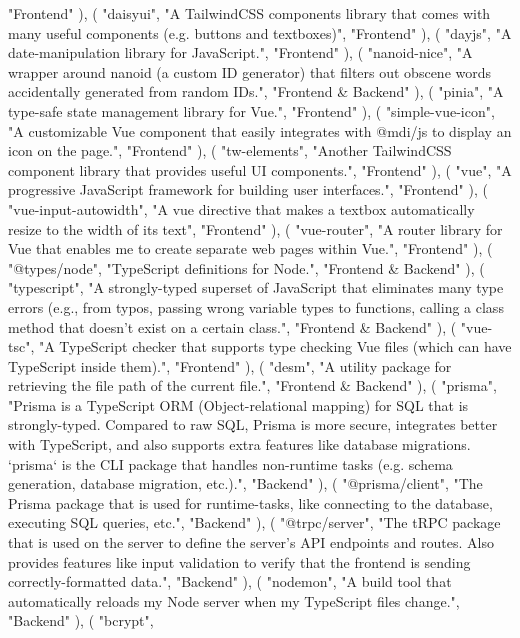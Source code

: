 \documentclass[12pt]{report}
\begin{document}
\begin{pycode}
		"Frontend"
	),
	(
		"daisyui",
		"A TailwindCSS components library that comes with many useful components (e.g. buttons and textboxes)",
		"Frontend"
	),
	(
		"dayjs",
		"A date-manipulation library for JavaScript.",
		"Frontend"
	),
	(
		"nanoid-nice",
		"A wrapper around nanoid (a custom ID generator) that filters out obscene words accidentally generated from random IDs.",
		"Frontend & Backend"
	),
	(
		"pinia",
		"A type-safe state management library for Vue.",
		"Frontend"
	),
	(
		"simple-vue-icon",
		"A customizable Vue component that easily integrates with @mdi/js to display an icon on the page.",
		"Frontend"
	),
	(
		"tw-elements",
		"Another TailwindCSS component library that provides useful UI components.",
		"Frontend"
	),
	(
		"vue",
		"A progressive JavaScript framework for building user interfaces.",
		"Frontend"
	),
	(
		"vue-input-autowidth",
		"A vue directive that makes a textbox automatically resize to the width of its text",
		"Frontend"
	),
	(
		"vue-router",
		"A router library for Vue that enables me to create separate web pages within Vue.",
		"Frontend"
	),
	(
		"@types/node",
		"TypeScript definitions for Node.",
		"Frontend & Backend"
	),
	(
		"typescript",
		"A strongly-typed superset of JavaScript that eliminates many type errors (e.g., from typos, passing wrong variable types to functions, calling a class method that doesn't exist on a certain class.",
		"Frontend & Backend"
	),
	(
		"vue-tsc",
		"A TypeScript checker that supports type checking Vue files (which can have TypeScript inside them).",
		"Frontend"
	),
	(
		"desm",
		"A utility package for retrieving the file path of the current file.",
		"Frontend & Backend"
	),
	(
		"prisma",
		"Prisma is a TypeScript ORM (Object-relational mapping) for SQL that is strongly-typed. Compared to raw SQL, Prisma is more secure, integrates better with TypeScript, and also supports extra features like database migrations. `prisma` is the CLI package that handles non-runtime tasks (e.g. schema generation, database migration, etc.).",
		"Backend"
	),
	(
		"@prisma/client",
		"The Prisma package that is used for runtime-tasks, like connecting to the database, executing SQL queries, etc.",
		"Backend"
	),
	(
		"@trpc/server",
		"The tRPC package that is used on the server to define the server's API endpoints and routes. Also provides features like input validation to verify that the frontend is sending correctly-formatted data.",
		"Backend"
	),
	(
		"nodemon",
		"A build tool that automatically reloads my Node server when my TypeScript files change.",
		"Backend"
	),
	(
		"bcrypt",

\end{pycode}
\end{document}

